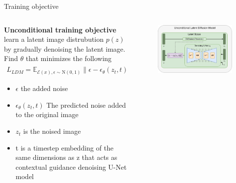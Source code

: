 \documentclass[8pt]{beamer}
\begin{document}
\begin{frame}{Training objective}
    \begin{columns}
        \begin{column}{0.5\textwidth}
            \textbf{Unconditional training objective} learn a latent image distrubution $p(z)$ by gradually denoising the latent image. Find $\theta$ that minimizes the following
            \begin{align*}
                L_{LDM} = \mathbb{E}_{\mathcal{E}(x), \epsilon \sim \text{N}(0,1)} \lVert \epsilon - \epsilon_{\theta}(z_t, t) \rVert_2^2
            \end{align*}
            \begin{itemize}
                \item $\epsilon$ the added noise
                \item $\epsilon_{\theta}(z_t, t)$ The predicted noise added to the original image
                \item $z_t$ is the noised image
                \item t is a timestep embedding of the same dimensions as z that acts as contextual guidance denoising U-Net model
            \end{itemize}
        \end{column}
        \begin{column}{0.5\textwidth}
           \begin{figure}
               \centering
               \includegraphics[scale=0.2]{images/sd_unconditional_objective}
               \label{fig:NN_training}
           \end{figure}
        \end{column}
    \end{columns}
\end{frame}
\end{document}
